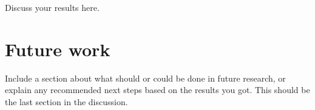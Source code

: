 
Discuss your results here.

\section{Future work}

Include a section about what should or could be done in future research, or explain any recommended next steps based on the results you got. This should be the last section in the discussion.